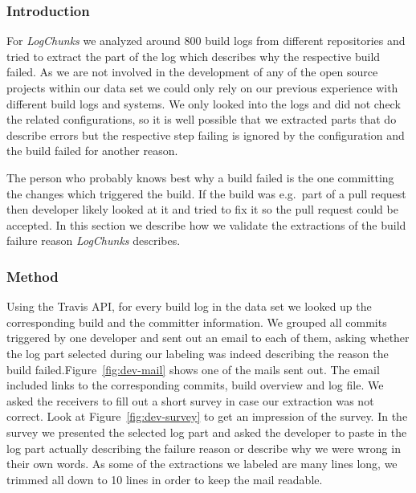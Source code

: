 \documentclass[\myrootdir/main.tex]{subfiles}
\begin{document}
\subsubsection{Introduction}
For \emph{LogChunks} we analyzed around 800 build logs from different repositories and tried to extract the part of the log which describes why the respective build failed.
As we are not involved in the development of any of the open source projects within our data set we could only rely on our previous experience with different build logs and systems.
We only looked into the logs and did not check the related configurations, so it is well possible that we extracted parts that do describe errors but the respective step failing is ignored by the configuration and the build failed for another reason.

The person who probably knows best why a build failed is the one committing the changes which triggered the build.
If the build was e.g.\ part of a pull request then developer likely looked at it and tried to fix it so the pull request could be accepted.
In this section we describe how we validate the extractions of the build failure reason \emph{LogChunks} describes.
\subsubsection{Method}
Using the Travis API, for every build log in the data set we looked up the corresponding build and the committer information.
We grouped all commits triggered by one developer and sent out an email to each of them, asking whether the log part selected during our labeling was indeed describing the reason the build failed.Figure~\ref{fig:dev-mail} shows one of the mails sent out.
The email included links to the corresponding commits, build overview and log file.
We asked the receivers to fill out a short survey in case our extraction was not correct.
Look at Figure~\ref{fig:dev-survey} to get an impression of the survey.
In the survey we presented the selected log part and asked the developer to paste in the log part actually describing the failure reason or describe why we were wrong in their own words.
As some of the extractions we labeled are many lines long, we trimmed all down to 10 lines in order to keep the mail readable.
\end{document}

